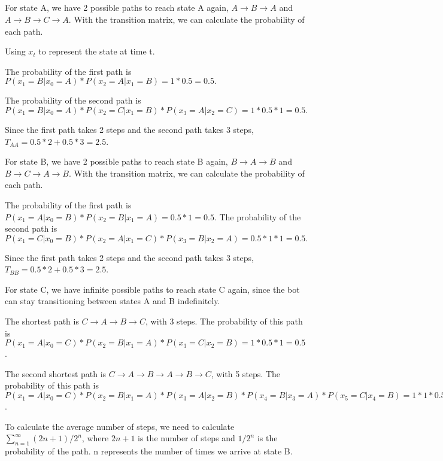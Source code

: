 \documentclass{article}
\begin{document}
\subsection{}

For state A, we have 2 possible paths to reach state A again, $A \rightarrow B \rightarrow A$ and 
$A \rightarrow B \rightarrow C \rightarrow A$. With the transition matrix, we can calculate the probability of each path.

\bigskip

Using $x_t$ to represent the state at time t. 

The probability of the first path is $P(x_1=B|x_0=A) * P(x_2=A|x_1=B) = 1 * 0.5 = 0.5.$

The probability of the second path is $P(x_1=B|x_0=A) * P(x_2=C|x_1=B) * P(x_3=A|x_2=C) = 1 * 0.5 * 1 = 0.5.$


Since the first path takes 2 steps and the second path takes 3 steps, 
$T_{AA} = 0.5 * 2 + 0.5 * 3 = 2.5$.

\bigskip

For state B, we have 2 possible paths to reach state B again, $B \rightarrow A \rightarrow B$ and
$B \rightarrow C \rightarrow A \rightarrow B$. With the transition matrix, we can calculate the probability of each path.

The probability of the first path is $P(x_1=A|x_0=B) * P(x_2=B|x_1=A) = 0.5 * 1 = 0.5.$
The probability of the second path is $P(x_1=C|x_0=B) * P(x_2=A|x_1=C) * P(x_3=B|x_2=A) = 0.5 * 1 * 1 = 0.5.$

Since the first path takes 2 steps and the second path takes 3 steps,
$T_{BB} = 0.5 * 2 + 0.5 * 3 = 2.5$.

\bigskip

For state C, we have infinite possible paths to reach state C again, since the bot can stay transitioning between states A and B indefinitely.

The shortest path is $C \rightarrow A \rightarrow B \rightarrow C$, with 3 steps.
The probability of this path is $P(x_1=A|x_0=C) * P(x_2=B|x_1=A) * P(x_3=C|x_2=B) = 1 * 0.5 * 1 = 0.5$.

The second shortest path is $C \rightarrow A \rightarrow B \rightarrow A \rightarrow B \rightarrow C$, with 5 steps.
The probability of this path is $P(x_1=A|x_0=C) * P(x_2=B|x_1=A) * P(x_3=A|x_2=B) * P(x_4=B|x_3=A) * P(x_5=C|x_4=B) 
= 1 * 1 * 0.5 * 1 * 0.5 = 0.25$.


To calculate the average number of steps, we need to calculate $\sum_{n=1}^{\infty} (2n + 1) / 2^n$, 
where $2n + 1$ is the number of steps and $1/2^n$ is the probability of the path. n represents the number of times we arrive at 
state B.
\end{document}
